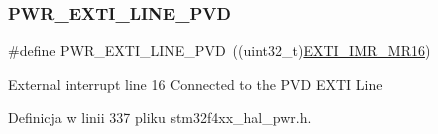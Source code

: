 \subsubsection{\texorpdfstring{P\+W\+R\+\_\+\+E\+X\+T\+I\+\_\+\+L\+I\+N\+E\+\_\+\+P\+VD}{PWR\_EXTI\_LINE\_PVD}}
{\footnotesize\ttfamily \#define P\+W\+R\+\_\+\+E\+X\+T\+I\+\_\+\+L\+I\+N\+E\+\_\+\+P\+VD~((uint32\+\_\+t)\hyperlink{group___peripheral___registers___bits___definition_ga7419f78ed9044bdd237b452ef49e1b7f}{E\+X\+T\+I\+\_\+\+I\+M\+R\+\_\+\+M\+R16})}

External interrupt line 16 Connected to the P\+VD E\+X\+TI Line 

Definicja w linii 337 pliku stm32f4xx\+\_\+hal\+\_\+pwr.\+h.

